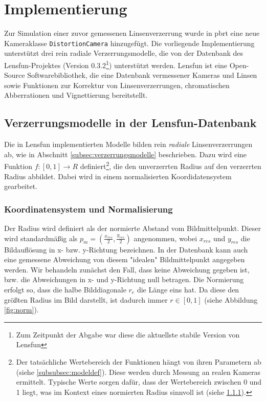 \newpage
\section{Implementierung}

Zur Simulation einer zuvor gemessenen Linsenverzerrung wurde in pbrt eine neue Kameraklasse \texttt{DistortionCamera} hinzugefügt. Die vorliegende Implementierung unterstützt drei rein radiale Verzerrungsmodelle, die von der Datenbank des Lensfun-Projektes\cite{lensfun_basic} (Version 0.3.2\footnote{Zum Zeitpunkt der Abgabe war diese die aktuellste stabile Version von Lensfun}) unterstützt werden. Lensfun ist eine Open-Source Softwarebibliothek, die eine Datenbank vermessener Kameras und Linsen sowie Funktionen zur Korrektur von Linsenverzerrungen, chromatischen Abberrationen und Vignettierung bereitstellt.

\subsection{Verzerrungsmodelle in der Lensfun-Datenbank}

Die in Lensfun implementierten Modelle bilden rein \emph{radiale} Linsenverzerrungen ab, wie in Abschnitt \ref{subsec:verzerrungsmodelle} beschrieben. Dazu wird eine Funktion $f:[0,1] \rightarrow R$ definiert\footnote{Der tatsächliche Wertebereich der Funktionen hängt von ihren Parametern ab (siehe \ref{subsubsec:modeldef}). Diese werden durch Messung an realen Kameras ermittelt. Typische Werte sorgen dafür, dass der Wertebereich zwischen 0 und 1 liegt, was im Kontext eines normierten Radius sinnvoll ist (siehe \ref{subsubsec:norm_radius}).}, die den unverzerrten Radius auf den verzerrten Radius abbildet. Dabei wird in einem normalisierten Koordidatensystem gearbeitet.

\subsubsection{Koordinatensystem und Normalisierung}
\label{subsubsec:norm_radius}

Der Radius wird definiert als der normierte Abstand vom Bildmittelpunkt. Dieser wird standardmäßig als $p_m = (\frac{x_{res}}{2}, \frac{y_{res}}{2})$ angenommen, wobei $x_{res}$ und $y_{res}$ die Bildauflösung in x- bzw. y-Richtung bezeichnen. In der Datenbank kann auch eine gemessene Abweichung von diesem "idealen" Bildmittelpunkt angegeben werden. Wir behandeln zunächst den Fall, dass keine Abweichung gegeben ist, bzw. die Abweichungen in x- und y-Richtung null betragen. Die Normierung erfolgt so, dass die halbe Bilddiagonale $r_e$ die Länge eins hat. Da diese den größten Radius im Bild darstellt, ist dadurch immer $r \in [0,1]$ (siehe Abbildung \ref{fig:norm}). 

